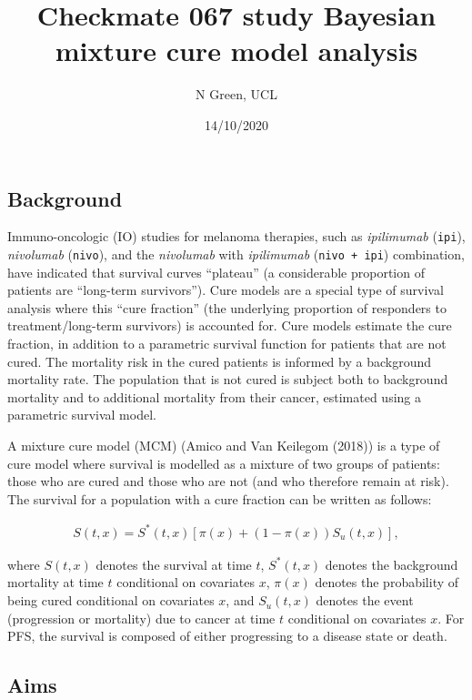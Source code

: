 \documentclass[
]{article}
\title{Checkmate 067 study Bayesian mixture cure model analysis}
\author{N Green, UCL}
\date{14/10/2020}
\begin{document}
\maketitle

\hypertarget{background}{%
\subsection{Background}\label{background}}

Immuno-oncologic (IO) studies for melanoma therapies, such as
\emph{ipilimumab} (\texttt{ipi}), \emph{nivolumab} (\texttt{nivo}), and
the \emph{nivolumab} with \emph{ipilimumab} (\texttt{nivo\ +\ ipi})
combination, have indicated that survival curves ``plateau'' (a
considerable proportion of patients are ``long-term survivors''). Cure
models are a special type of survival analysis where this ``cure
fraction'' (the underlying proportion of responders to
treatment/long-term survivors) is accounted for. Cure models estimate
the cure fraction, in addition to a parametric survival function for
patients that are not cured. The mortality risk in the cured patients is
informed by a background mortality rate. The population that is not
cured is subject both to background mortality and to additional
mortality from their cancer, estimated using a parametric survival
model.

A mixture cure model (MCM) (Amico and Van Keilegom (2018)) is a type of
cure model where survival is modelled as a mixture of two groups of
patients: those who are cured and those who are not (and who therefore
remain at risk). The survival for a population with a cure fraction can
be written as follows:

\begin{align}
\tag{*}
S(t, x) = S^*(t, x)[\pi(x) + (1 − \pi(x))S_u(t, x)],
\end{align}

where \(S(t, x)\) denotes the survival at time \(t\), \(S^*(t, x)\)
denotes the background mortality at time \(t\) conditional on covariates
\(x\), \(\pi(x)\) denotes the probability of being cured conditional on
covariates \(x\), and \(S_u(t, x)\) denotes the event (progression or
mortality) due to cancer at time \(t\) conditional on covariates \(x\).
For PFS, the survival is composed of either progressing to a disease
state or death.

\hypertarget{aims}{%
\subsection{Aims}\label{aims}}
\end{document}

